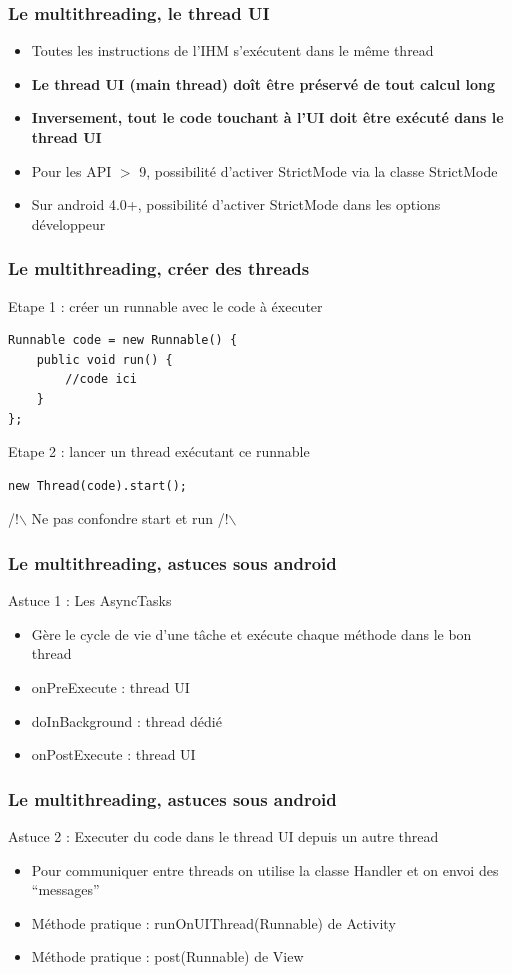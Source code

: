 \documentclass{beamer}
\begin{document}
\begin{frame}[fragile] 
\frametitle{Le multithreading, le thread UI}
\begin{itemize}
  \item Toutes les instructions de l'IHM s'exécutent dans le même thread
  \item \textbf{Le thread UI (main thread) doît être préservé de tout calcul long}
  \item \textbf{Inversement, tout le code touchant à l'UI doit être exécuté dans le thread UI}
  \item Pour les API $>$ 9, possibilité d'activer StrictMode via la classe StrictMode
  \item Sur android 4.0+, possibilité d'activer StrictMode dans les options développeur
\end{itemize}
\end{frame}
\begin{frame}[fragile] 
\frametitle{Le multithreading, créer des threads}
Etape 1 : créer un runnable avec le code à éxecuter
\begin{lstlisting}
Runnable code = new Runnable() {
    public void run() {
        //code ici
    }
};
\end{lstlisting}
Etape 2 : lancer un thread exécutant ce runnable
\begin{lstlisting}
new Thread(code).start();
\end{lstlisting}
/!$\backslash$ Ne pas confondre start et run /!$\backslash$
\end{frame}
\begin{frame}[fragile] 
\frametitle{Le multithreading, astuces sous android}
Astuce 1 : Les AsyncTasks
\begin{itemize}
  \item Gère le cycle de vie d'une tâche et exécute chaque méthode dans le bon thread
  \item onPreExecute : thread UI
  \item doInBackground : thread dédié
  \item onPostExecute : thread UI
\end{itemize}
\end{frame}
\begin{frame}[fragile] 
\frametitle{Le multithreading, astuces sous android}
Astuce 2 : Executer du code dans le thread UI depuis un autre thread
\begin{itemize}
  \item Pour communiquer entre threads on utilise la classe Handler et on envoi des ``messages''
  \item Méthode pratique : runOnUIThread(Runnable) de Activity
  \item Méthode pratique : post(Runnable) de View
\end{itemize}
\end{frame}
\end{document}
